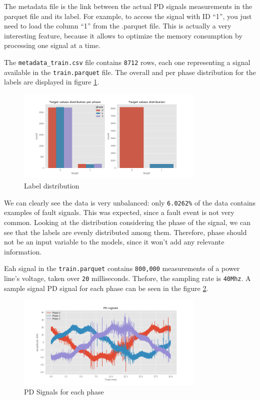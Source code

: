 \documentclass[11pt]{article}
\begin{document}
The metadata file is the link between the actual PD signals measurements
in the parquet file and its label. For example, to access the signal
with ID ``1'', you just need to load the column ``1'' from the .parquet
file. This is actually a very interesting feature, because it allows to
optimize the memory consumption by processing one signal at a time.

The \texttt{metadata\_train.csv} file contains \texttt{8712} rows, each
one representing a signal available in the \texttt{train.parquet} file.
The overall and per phase distribution for the labels are displayed in figure \ref{fig:pdsignal_dist}.

\begin{figure}[h]
\centering
\includegraphics[width=0.8\textwidth]{train_data_dist_twosided.png}
\caption{Label distribution}
\label{fig:pdsignal_dist} 
\end{figure}

We can clearly see the data is very unbalanced: only \texttt{6.0262\%}
of the data contains examples of fault signals. This was expected, since
a fault event is not very common. Looking at the distribution
considering the phase of the signal, we can see that the labels are
evenly distributed among them. Therefore, phase should not be an input
variable to the models, since it won't add any relevante information.

Eah signal in the \texttt{train.parquet} contains \texttt{800,000}
measurements of a power line's voltage, taken over \texttt{20}
milliseconds. Thefore, the sampling rate is \texttt{40Mhz}. A sample
signal PD signal for each phase can be seen in the figure \ref{fig:pdsignal}.

\begin{figure}[h]
\centering
\includegraphics[width=0.8\textwidth]{signal_phase_example.png}
\caption{PD Signals for each phase}
\label{fig:pdsignal}
\end{figure}
\end{document}
